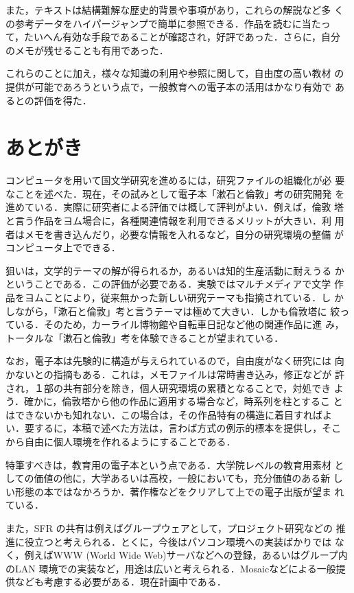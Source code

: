 また，テキストは結構難解な歴史的背景や事項があり，これらの解説など多
くの参考データをハイパージャンプで簡単に参照できる．作品を読むに当たっ
て，たいへん有効な手段であることが確認され，好評であった．さらに，自分
のメモが残せることも有用であった．

これらのことに加え，様々な知識の利用や参照に関して，自由度の高い教材
の提供が可能であろうという点で，一般教育への電子本の活用はかなり有効で
あるとの評価を得た．
                                                            
\section{あとがき}

コンピュータを用いて国文学研究を進めるには，研究ファイルの組織化が必
要なことを述べた．現在，その試みとして電子本「漱石と倫敦」考の研究開発
を進めている．実際に研究者による評価では概して評判がよい．例えば，倫敦
塔と言う作品をヨム場合に，各種関連情報を利用できるメリットが大きい．利
用者はメモを書き込んだり，必要な情報を入れるなど，自分の研究環境の整備
がコンピュータ上でできる．

狙いは，文学的テーマの解が得られるか，あるいは知的生産活動に耐えうる
かということである．この評価が必要である．実験ではマルチメディアで文学
作品をヨムことにより，従来無かった新しい研究テーマも指摘されている．し
かしながら，「漱石と倫敦」考と言うテーマは極めて大きい．しかも倫敦塔に
絞っている．そのため，カーライル博物館や自転車日記など他の関連作品に進
み，トータルな「漱石と倫敦」考を体験できることが望まれている．

なお，電子本は先験的に構造が与えられているので，自由度がなく研究には
向かないとの指摘もある．これは，メモファイルは常時書き込み，修正などが
許され，１部の共有部分を除き，個人研究環境の累積となることで，対処でき
よう．確かに，倫敦塔から他の作品に適用する場合など，時系列を柱とするこ
とはできないかも知れない．この場合は，その作品特有の構造に着目すればよ
い．要するに，本稿で述べた方法は，言わば方式の例示的標本を提供し，そこ
から自由に個人環境を作れるようにすることである．

特筆すべきは，教育用の電子本という点である．大学院レベルの教育用素材
としての価値の他に，大学あるいは高校，一般においても，充分価値のある新
しい形態の本ではなかろうか．著作権などをクリアして上での電子出版が望ま
れている．

また，SFR の共有は例えばグループウェアとして，プロジェクト研究などの
推進に役立つと考えられる．とくに，今後はパソコン環境への実装ばかりでは
なく，例えばWWW (World Wide Web)サーバなどへの登録，あるいはグループ内
のLAN 環境での実装など，用途は広いと考えられる．Mosaicなどによる一般提
供なども考慮する必要がある．現在計画中である．

